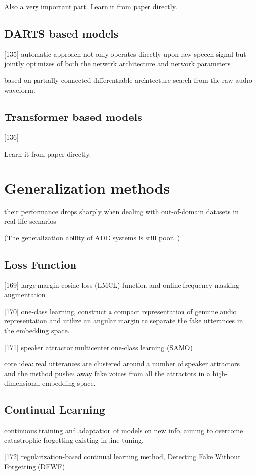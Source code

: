 \documentclass{article}
\begin{document}
Also a very important part. Learn it from paper directly. 

\subsection{DARTS based models}
[135] automatic approach not only operates directly upon raw speech signal but jointly optimizes of both the network architecture and network parameters

based on partially-connected differentiable architecture search from the raw audio waveform. 

\subsection{Transformer based models}
[136]

Learn it from paper directly. 

\section{Generalization methods}
their performance drops sharply when dealing with out-of-domain datasets in real-life scenarios

(The generalization ability of ADD systems is still poor. )

\subsection{Loss Function}
[169] large margin cosine loss (LMCL) function and online frequency masking augmentation

[170] one-class learning, construct a compact representation of genuine audio representation and utilize an angular margin to separate the fake utterances in the embedding space. 

[171] speaker attractor multicenter one-class learning (SAMO)

core idea: real utterances are clustered around a number of speaker attractors and the method pushes away fake voices from all the attractors in a high-dimensional embedding space. 

\subsection{Continual Learning}
continuous training and adaptation of models on new info, aiming to overcome catastrophic forgetting existing in fine-tuning. 

[172] regularization-based continual learning method, Detecting Fake Without Forgetting (DFWF)
\end{document}
